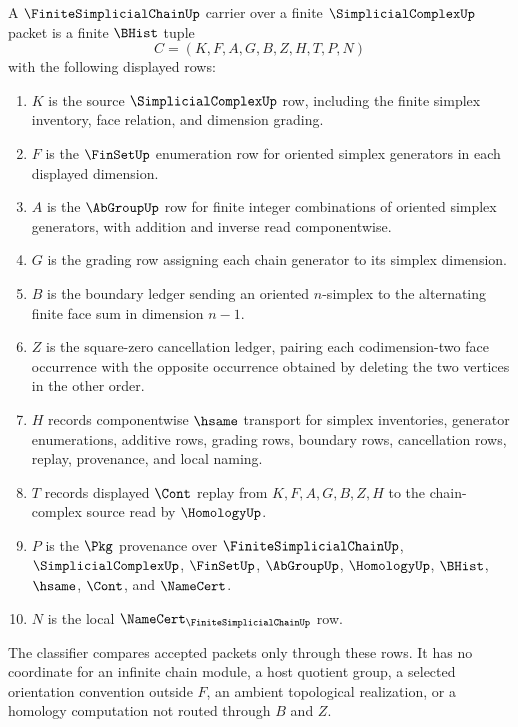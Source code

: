 \begin{definition}
\label{def:finite-simplicial-chain-carrier}
A $\FiniteSimplicialChainUp$ carrier over a finite $\SimplicialComplexUp$ packet is a finite $\BHist$ tuple
$$
C=(K,F,A,G,B,Z,H,T,P,N)
$$
with the following displayed rows:
\begin{enumerate}
\item $K$ is the source $\SimplicialComplexUp$ row, including the finite simplex inventory, face relation, and dimension grading.
\item $F$ is the $\FinSetUp$ enumeration row for oriented simplex generators in each displayed dimension.
\item $A$ is the $\AbGroupUp$ row for finite integer combinations of oriented simplex generators, with addition and inverse read componentwise.
\item $G$ is the grading row assigning each chain generator to its simplex dimension.
\item $B$ is the boundary ledger sending an oriented $n$-simplex to the alternating finite face sum in dimension $n-1$.
\item $Z$ is the square-zero cancellation ledger, pairing each codimension-two face occurrence with the opposite occurrence obtained by deleting the two vertices in the other order.
\item $H$ records componentwise $\hsame$ transport for simplex inventories, generator enumerations, additive rows, grading rows, boundary rows, cancellation rows, replay, provenance, and local naming.
\item $T$ records displayed $\Cont$ replay from $K,F,A,G,B,Z,H$ to the chain-complex source read by $\HomologyUp$.
\item $P$ is the $\Pkg$ provenance over $\FiniteSimplicialChainUp$, $\SimplicialComplexUp$, $\FinSetUp$, $\AbGroupUp$, $\HomologyUp$, $\BHist$, $\hsame$, $\Cont$, and $\NameCert$.
\item $N$ is the local $\NameCert_{\FiniteSimplicialChainUp}$ row.
\end{enumerate}
The classifier compares accepted packets only through these rows. It has no coordinate for an infinite chain module, a host quotient group, a selected orientation convention outside $F$, an ambient topological realization, or a homology computation not routed through $B$ and $Z$.
\end{definition}

